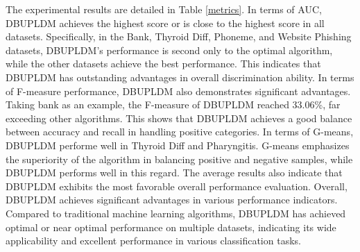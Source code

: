 \documentclass[a4paper]{cas-sc}
\begin{document}
The experimental results are detailed in Table \ref{metrics}. In terms of AUC, DBUPLDM achieves the highest score or is close to the highest score in all datasets. Specifically, in the Bank, Thyroid Diff, Phoneme, and Website Phishing datasets, DBUPLDM's performance is second only to the optimal algorithm, while the other datasets achieve the best performance. This indicates that DBUPLDM has outstanding advantages in overall discrimination ability. In terms of F-measure performance, DBUPLDM also demonstrates significant advantages. Taking bank as an example, the F-measure of DBUPLDM reached 33.06\%, far exceeding other algorithms. This shows that DBUPLDM achieves a good balance between accuracy and recall in handling positive categories. In terms of G-means, DBUPLDM performe well in Thyroid Diff and Pharyngitis. G-means emphasizes the superiority of the algorithm in balancing positive and negative samples, while DBUPLDM performs well in this regard. The average results also indicate that DBUPLDM exhibits the most favorable overall performance evaluation. Overall, DBUPLDM achieves significant advantages in various performance indicators. Compared to traditional machine learning algorithms, DBUPLDM has achieved optimal or near optimal performance on multiple datasets, indicating its wide applicability and excellent performance in various classification tasks.
\end{document}
